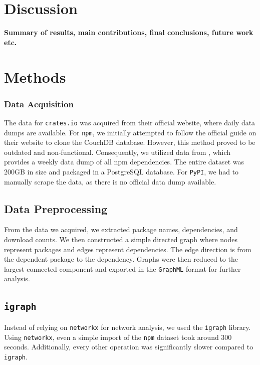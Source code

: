 \documentclass[9pt,twocolumn,twoside]{pnas-report}
\begin{document}
\section*{Discussion}

 {\bf Summary of results, main contributions, final conclusions, future work etc.}
\lipsum[1-3]

\small

\section*{Methods}


\subsubsection*{Data Acquisition} The data for \texttt{crates.io} was acquired from their official website, where daily data dumps are available.
For \texttt{npm}, we initially attempted to follow the official guide on their website to clone the CouchDB database.
However, this method proved to be outdated and non-functional.
Consequently, we utilized data from \cite{npmdata}, which provides a weekly data dump of all npm dependencies.
The entire dataset was 200GB in size and packaged in a PostgreSQL database.
For \texttt{PyPI}, we had to manually scrape the data, as there is no official data dump available.

\subsection*{Data Preprocessing} From the data we acquired, we extracted package names, dependencies, and download counts. We then constructed a simple directed graph where nodes represent packages and edges represent dependencies. The edge direction is from the dependent package to the dependency. Graphs were then reduced to the largest connected component and exported in the \texttt{GraphML} format for further analysis.

\subsection*{\texttt{igraph}} Instead of relying on \texttt{networkx} for network analysis, we used the \texttt{igraph} library. Using \texttt{networkx}, even a simple import of the \texttt{npm} dataset took around 300 seconds. Additionally, every other operation was significantly slower compared to \texttt{igraph}.
\end{document}
